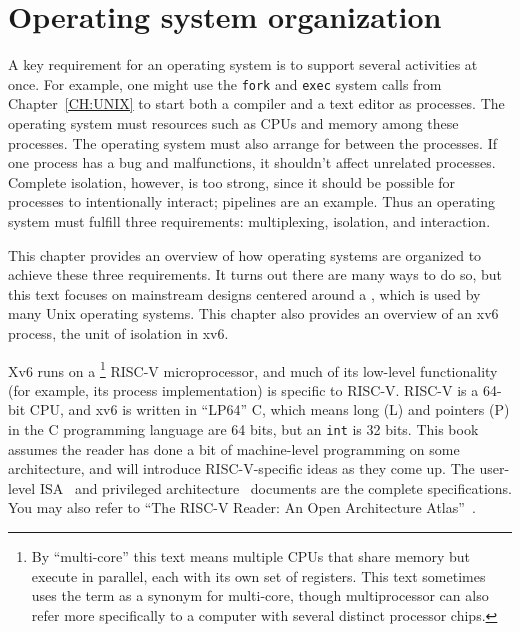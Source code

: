 
\chapter{Operating system organization}
\label{CH:FIRST}

A key requirement for an operating system is to support several activities at once.  For
example,
one might use the {\tt fork} and {\tt exec} system calls from
Chapter~\ref{CH:UNIX}
to start both a compiler and a text editor as processes.
The operating system must 
resources such as CPUs and memory among these processes.
The operating system must also arrange for
between the processes.
If one process has a bug and malfunctions,
it shouldn't affect unrelated processes.
Complete isolation, however, is too strong, since it should be possible for
processes to intentionally interact; pipelines are an example.
Thus
an operating system must fulfill three requirements: multiplexing, isolation,
and interaction.

This chapter provides an overview of how operating systems are
organized to achieve these three requirements.  It turns out there are
many ways to do so, but this text focuses on mainstream designs
centered around a , which is used by many
Unix operating systems.  This chapter also provides an overview of an
xv6 process, the unit of isolation in xv6.

Xv6 runs on a \footnote{
By ``multi-core'' this text means multiple CPUs that share memory but execute
in parallel, each with its own set of registers.
This text sometimes uses the term
 as a synonym for multi-core,
though multiprocessor can also refer more specifically to a computer with
several distinct processor chips.} RISC-V microprocessor,
and much of its low-level
functionality (for example, its process implementation) is specific to
RISC-V.  RISC-V is a 64-bit CPU, and xv6 is written in ``LP64'' C,
which means long (L) and pointers (P) in the C programming language
are 64 bits, but an {\tt int} is 32 bits.  This book assumes the reader has done
a bit of machine-level programming on some architecture, and will
introduce RISC-V-specific ideas as they come up.
The user-level ISA~\cite{riscv:user} and privileged
architecture~\cite{riscv:priv} documents are the complete
specifications.
You may also refer to
``The RISC-V Reader: An Open Architecture
Atlas''~\cite{riscv}.

